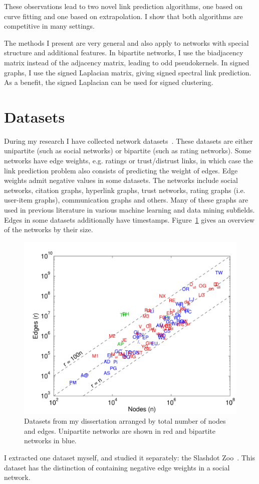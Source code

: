 \documentclass[10pt,twocolumn]{article}
\begin{document}
These observations lead to two novel link prediction algorithms, one
based on curve fitting and one based on extrapolation.  I show that both
algorithms are competitive in many settings. 

The methods I present are very general and also apply to networks with
special structure and additional features.  In bipartite networks, I
use the biadjacency matrix instead of the adjacency matrix, leading
to odd pseudokernels.  In signed graphs, I use the signed
Laplacian matrix, giving signed spectral link prediction.  As a 
benefit, the signed Laplacian can be used for signed clustering. 

\section{Datasets}
During my research I have collected network
datasets~\cite{kunegis:network-survey}.  These datasets 
are either unipartite (such as social networks) or bipartite (such as
rating networks).  Some networks have edge weights, e.g. ratings or
trust/distrust links, in which case the link prediction problem also
consists of predicting the weight of edges.  Edge weights admit negative
values in some datasets. 
The networks include social networks, citation
graphs, hyperlink graphs, trust networks, rating graphs (i.e. user-item
graphs), communication graphs and others.  
Many of these graphs are used
in previous literature in various machine learning and data mining
subfields.  
Edges in some datasets additionally have timestamps. 
Figure~\ref{fig:sizes} gives an overview of the networks by
their size. 

\begin{figure}
  \centering
  \includegraphics[width=.48\textwidth]{scatter.network-survey-relationships.a}
  \caption{
    Datasets from my dissertation arranged by total number of nodes and edges. 
    Unipartite networks are shown in red and bipartite networks in
    blue. 
  }
  \label{fig:sizes}
\end{figure}
I extracted one dataset myself, and studied it
separately:  the Slashdot Zoo~\cite{kunegis:slashdot-zoo}. 
This dataset has the distinction of
containing negative edge weights in a social network. 
\end{document}
